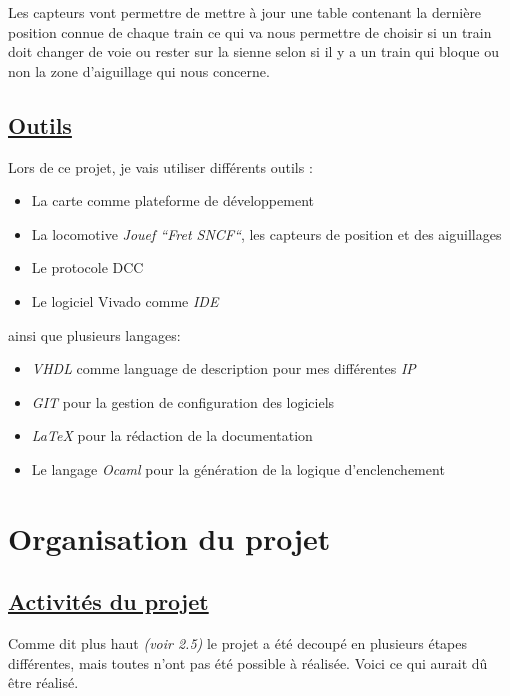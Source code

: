 Les capteurs vont permettre de mettre à jour une table contenant la
dernière position connue de chaque train ce qui va nous permettre de
choisir si un train doit changer de voie ou rester sur la sienne selon
si il y a un train qui bloque ou non la zone d'aiguillage qui nous concerne.


\subsection{\underline{Outils}}
\label{sec:outils}

Lors de ce projet, je vais utiliser diff\'erents outils :
\begin{itemize}
  \item La carte \crt comme plateforme de d\'eveloppement
  \item La locomotive \emph{Jouef ``Fret SNCF``}\cite{Jouef}, les capteurs de
    position et des aiguillages
  \item Le protocole DCC \cite{DCC}
  \item Le logiciel Vivado comme \emph{IDE}
\end{itemize}

ainsi que plusieurs langages:
\begin{itemize}
  \item \emph{VHDL}\cite{VHDL} comme language de description pour mes diff\'erentes
    \emph{IP}
  \item \emph{GIT}\cite{GIT} pour la gestion de configuration des logiciels
  \item \emph{\LaTeX}\cite{LATEX} pour la r\'edaction de la documentation
  \item Le langage \emph{Ocaml}\cite{OCAML} pour la g\'en\'eration de la logique d'enclenchement
\end{itemize}

\newpage
\section{Organisation du projet}
\label{sec:org_proj}

\subsection{\underline{Activit\'es du projet}}
\label{sec:activ}

Comme dit plus haut \emph{(voir 2.5)} le projet a \'et\'e decoup\'e en
plusieurs \'etapes diff\'erentes, mais toutes n'ont pas été
possible à réalisée.
Voici ce qui aurait dû être réalisé.


